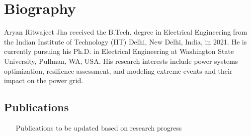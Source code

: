 \section{Biography}
\small
Aryan Ritwajeet Jha received the B.Tech. degree in Electrical Engineering from the Indian Institute of Technology (IIT) Delhi, New Delhi, India, in 2021. He is currently pursuing his Ph.D. in Electrical Engineering at Washington State University, Pullman, WA, USA. His research interests include power systems optimization, resilience assessment, and modeling extreme events and their impact on the power grid.
\singlespacing

\subsection{Publications}
\small
\begin{enumerate}
    \item [Publications to be updated based on research progress]
\end{enumerate}

  
\clearpage
